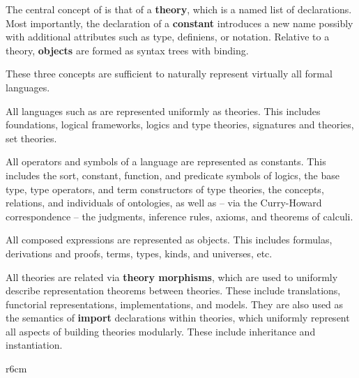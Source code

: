 The central concept of \mmt is that of a \textbf{theory}, which is a named list of declarations.
Most importantly, the declaration of a \textbf{constant} introduces a new name possibly with additional attributes such as type, definiens, or notation.
Relative to a theory, \textbf{objects} are formed as syntax trees with binding.

These three concepts are sufficient to naturally represent virtually all formal languages.
\begin{compactitem}
\item All languages such as are represented uniformly as {\mmt} theories.
This includes foundations, logical frameworks, logics and type theories, signatures and theories, set theories.
\item All operators and symbols of a language are represented as \mmt constants.
This includes the sort, constant, function, and predicate symbols of logics, the base type, type operators, and term constructors of type theories, the concepts, relations, and individuals of ontologies, as well as -- via the Curry-Howard correspondence -- the judgments, inference rules, axioms, and theorems of calculi.
\item All composed expressions are represented as objects.
This includes formulas, derivations and proofs, terms, types, kinds, and universes, etc.
\end{compactitem}

All {\mmt} theories are related via \textbf{theory morphisms}, which are used to uniformly describe representation theorems between theories.
These include translations, functorial representations, implementations, and models.
They are also used as the semantics of \textbf{import} declarations within theories, which uniformly represent all aspects of building theories modularly.
These include inheritance and instantiation.

\begin{wrapfigure}r{6cm}
\vspace{-1em}
\end{wrapfigure}

